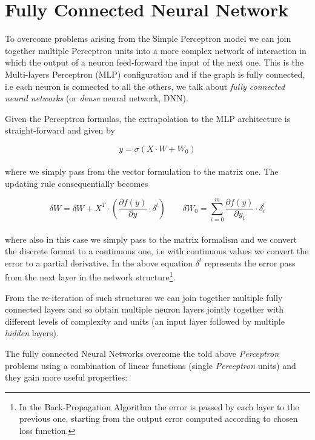 \documentclass{standalone}
\begin{document}
\section[Fully Connected Neural Network]{Fully Connected Neural Network}\label{connected}

To overcome problems arising from the Simple Perceptron model we can join together multiple Perceptron units into a more complex network of interaction in which the output of a neuron feed-forward the input of the next one.
This is the Multi-layers Perceptron (MLP) configuration and if the graph is fully connected, i.e each neuron is connected to all the others, we talk about \emph{fully connected neural networks} (or \emph{dense} neural network, DNN).

Given the Perceptron formulas, the extrapolation to the MLP architecture is straight-forward and given by

$$
y = \sigma\left(X \cdot W + W_0 \right)
$$
\\
where we simply pass from the vector formulation to the matrix one.
The updating rule consequentially becomes

$$
\delta W = \delta W + X^T \cdot \left( \frac{\partial f(y)}{\partial y} \cdot \delta^l \right)  \quad\quad \delta W_0 = \sum_{i=0}^{m}\frac{\partial f(y)}{\partial y_i} \cdot \delta_i^l
$$
\\
where also in this case we simply pass to the matrix formalism and we convert the discrete format to a continuous one, i.e with continuous values we convert the error to a partial derivative.
In the above equation $\delta^l$ represents the error pass from the next layer in the network structure\footnote{
  In the Back-Propagation Algorithm the error is passed by each layer to the previous one, starting from the output error computed according to chosen loss function.
}.

From the re-iteration of such structures we can join together multiple fully connected layers and so obtain multiple neuron layers jointly together with different levels of complexity and units (an input layer followed by multiple \emph{hidden} layers).

The fully connected Neural Networks overcome the told above \emph{Perceptron} problems using a combination of linear functions (single \emph{Perceptron} units) and they gain more useful properties:
\end{document}
